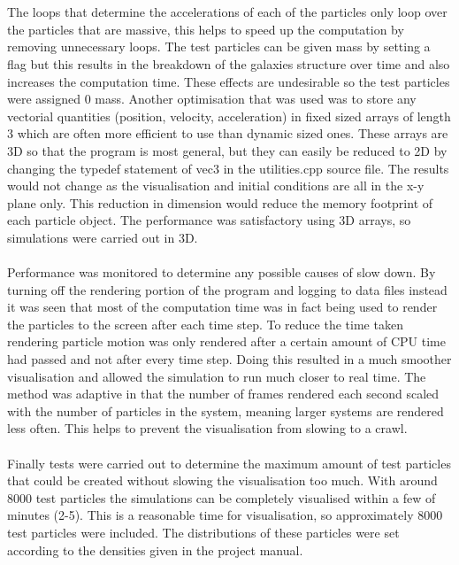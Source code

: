 \documentclass[10pt,a4paper]{article}
\begin{document}
\\
\\
The loops that determine the accelerations of each of the particles only loop over the particles that are massive, this helps to speed up the computation by removing unnecessary loops. The test particles can be given mass by setting a flag but this results in the breakdown of the galaxies structure over time and also increases the computation time. These effects are undesirable so the test particles were assigned 0 mass. Another optimisation that was used was to store any vectorial quantities (position, velocity, acceleration) in fixed sized arrays of length 3 which are often more efficient to use than dynamic sized ones. These arrays are 3D so that the program is most general, but they can easily be reduced to 2D by changing the typedef statement of vec3 in the utilities.cpp source file. The results would not change as the visualisation and initial conditions are all in the x-y plane only. This reduction in dimension would reduce the memory footprint of each particle object. The performance was satisfactory using 3D arrays, so simulations were carried out in 3D. 
\\
\\
Performance was monitored to determine any possible causes of slow down. By turning off the rendering portion of the program and logging to data files instead it was seen that most of the computation time was in fact being used to render the particles to the screen after each time step. To reduce the time taken rendering particle motion was only rendered after a certain amount of CPU time had passed and not after every time step. Doing this resulted in a much smoother visualisation and allowed the simulation to run much closer to real time. The method  was adaptive in that the number of frames rendered each second scaled with the number of particles in the system, meaning larger systems are rendered less often. This helps to prevent the visualisation from slowing to a crawl.
\\
\\
Finally tests were carried out to determine the maximum amount of test particles that could be created without slowing the visualisation too much. With around 8000 test particles the simulations can be completely visualised within a few of minutes (2-5). This is a reasonable time for visualisation, so approximately 8000 test particles were included. The distributions of these particles were set according to the densities given in the project manual.
\\
\end{document}
